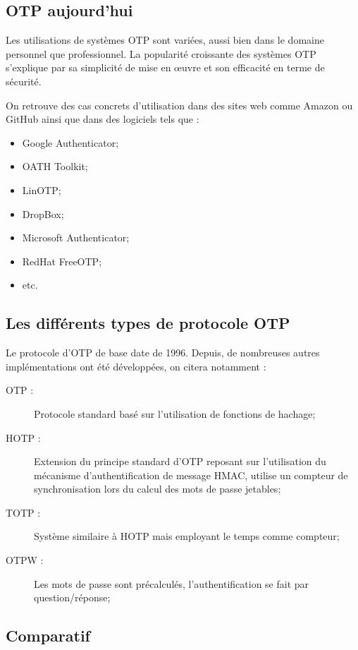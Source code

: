 \subsection{OTP aujourd'hui}

	Les utilisations de systèmes OTP sont variées, aussi bien dans le domaine
	personnel que professionnel. La popularité croissante des systèmes OTP
	s'explique par sa simplicité de mise en œuvre et son efficacité en terme
	de sécurité.

	On retrouve des cas concrets d'utilisation dans des sites web comme Amazon
	ou GitHub ainsi que dans des logiciels tels que :

	\begin{itemize}
		\item Google Authenticator;
		\item OATH Toolkit;
		\item LinOTP;
		\item DropBox;
		\item Microsoft	Authenticator;
		\item RedHat FreeOTP;
		\item etc.
	\end{itemize}

\subsection{Les différents types de protocole OTP}

	Le protocole d'OTP de base date de 1996. Depuis, de nombreuses autres
	implémentations ont été développées, on citera notamment :

	\begin{description}
		\item[OTP :] Protocole standard basé sur l'utilisation de fonctions de
		hachage;
		\item[HOTP :] Extension du principe standard d'OTP reposant sur
		l'utilisation du mécanisme d'authentification de message HMAC, utilise
		un compteur de synchronisation lors du calcul des mots de passe
		jetables;
		\item[TOTP :] Système similaire à HOTP mais employant le temps comme
		compteur;
		\item[OTPW :] Les mots de passe sont précalculés, l'authentification
		se fait par question/réponse;
	\end{description}

\subsection{Comparatif}
